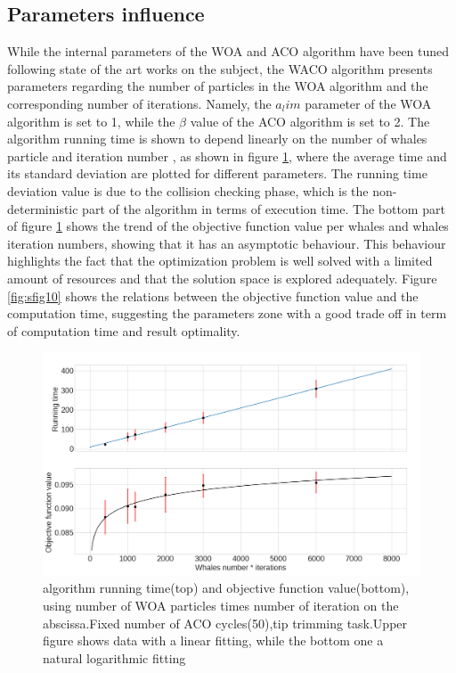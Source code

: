 \documentclass[twocolumn]{svjour3}
\begin{document}
\subsection{Parameters influence}
While the internal parameters of the WOA and ACO algorithm have been tuned following state of the art works on the subject, the WACO algorithm presents parameters regarding the number of particles in the WOA algorithm and the corresponding number of iterations.
Namely, the $a_lim$ parameter of the WOA algorithm is set to 1, while the $\beta$ value of the ACO algorithm is set to 2.
The algorithm running time is shown to depend linearly on the number of whales particle and iteration number , as shown in figure \ref{fig:sfig9}, where the average time and its standard deviation are plotted for different parameters.
The running time deviation value is due to the collision checking phase, which is the non-deterministic part of the algorithm in terms of execution time.
The bottom part of figure \ref{fig:sfig9} shows the trend of the objective function value per whales and whales iteration numbers, showing that it has an asymptotic behaviour. 
This behaviour highlights the fact that the optimization problem is well solved with a limited amount of resources and that the solution space is explored adequately.
Figure \ref{fig:sfig10} shows the relations between the objective function value and the computation time, suggesting the parameters zone with a good trade off in term of computation time and result optimality.  
\begin{figure}[h]
		\includegraphics[width=1\linewidth]{solstimes.png}
		\caption{algorithm running time(top) and objective function value(bottom), using number of WOA particles times number of iteration on the abscissa.Fixed number of ACO cycles(50),tip trimming task.Upper figure shows data with a  linear fitting, while the bottom one a natural logarithmic fitting}
		\label{fig:sfig9}
\end{figure}
\end{document}
